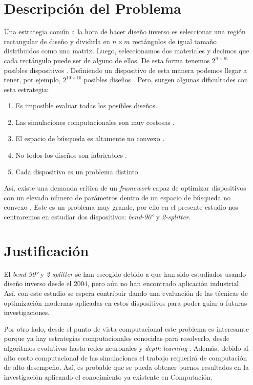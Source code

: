 \section{Descripción del  Problema}

Una estrategia común a la hora de hacer diseño inverso es seleccionar una región rectangular de diseño y dividirla en $n \times m$ rectángulos
de igual tamaño distribuidos como una matrix. 
Luego, seleccionamos dos materiales y decimos que cada rectángulo puede ser de alguno de ellos. 
De esta forma tenemos $2^{n \times m}$ posibles dispositivos \cite{Su2020}. 
Definiendo un dispositivo de esta manera podemos llegar a tener, por ejemplo, $2^{10 \times 10}$ posibles diseños \cite{Malheiros-Silveira2020}.
Pero, surgen algunas dificultades con esta estrategia:

\begin{enumerate}
  \item Es imposible evaluar todas los posibles diseños.
  \item Las simulaciones computacionales son muy costosas \cite{Kudyshev2020}.
  \item El espacio de búsqueda es altamente no convexo \cite{Su2018}.
  \item No todos los diseños son fabricables \cite{Su2020}.
  \item Cada dispositivo es un problema distinto \cite{Molesky2018}
\end{enumerate}


Así, existe una demanda crítica de un \emph{framework} capaz de optimizar dispositivos con un elevado número de parámetros dentro de un espacio de búsqueda no convexo \cite{Kudyshev2020}. Este es un problema muy grande, por ello en el presente estudio nos centraremos en estudiar dos dispositivos: \emph{bend-90°} y \emph{2-splitter}.

\section{Justificación}

El \emph{bend-90°} y \emph{2-splitter} se han escogido debido a que han sido estudiados usando diseño inverso desde el 2004, pero aún no han encontrado aplicación industrial \cite{Molesky2018}. 
Así, con este estudio se espera contribuir dando una evaluación de las técnicas de optimización modernas aplicadas en estos dispositivos para poder guiar a futuras investigaciones.

Por otro lado, desde el punto de vista computacional este problema es interesante porque ya hay estrategias computacionales conocidas para resolverlo, desde algoritmos evolutivos \cite{Hansen2016} hasta redes neuronales \cite{Goodfellow2015} y \emph{depth learning} \cite{Malkiel2018}. 
Además, debido al alto costo computacional de las simulaciones \cite{Schneider2019} el trabajo requerirá de computación de alto desempeño.
Así, es probable que se pueda obtener buenos resultados en la investigación aplicando el conocimiento ya existente en Computación.

